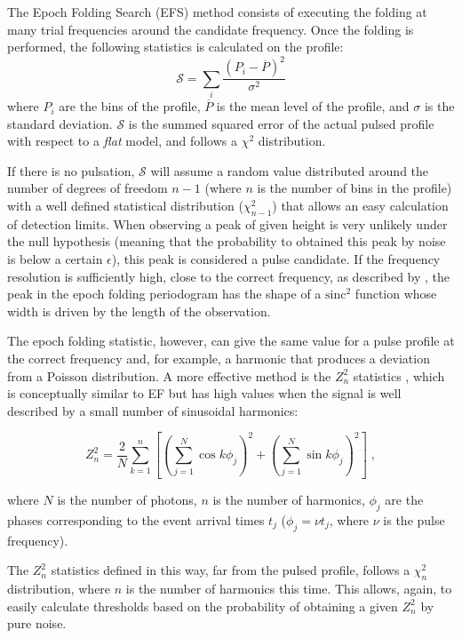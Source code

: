 \documentclass[twocolumn]{aastex62}
\newcommand{\zsq}{\ensuremath{Z^2_n}\xspace}
\begin{document}
The Epoch Folding Search (EFS) method consists of executing the folding at many trial frequencies around the candidate frequency.
Once the folding is performed, the following statistics is calculated on the profile:
\begin{equation}
\mathcal{S} = \sum_i\frac{(P_i - \overline{P})^2}{\sigma^2}
\end{equation}
where $P_i$ are the bins of the profile, $\overline{P}$ is the mean level of the profile, and $\sigma$ is the standard deviation.
$\mathcal{S}$ is the summed squared error of the actual pulsed profile with respect to a \textit{flat} model, and follows a $\chi^2$ distribution.

If there is no pulsation, $\mathcal{S}$ will assume a random value distributed around the number of degrees of freedom $n - 1$ (where $n$ is the number of bins in the profile) with a well defined statistical distribution ($\chi^2_{n - 1}$) that allows an easy calculation of detection limits. 
When observing a peak of given height is very unlikely under the null hypothesis (meaning that the probability to obtained this peak by noise is below a certain $\epsilon$), this peak is considered a pulse candidate.
If the frequency resolution is sufficiently high, close to the correct frequency, as described by \citep{leahy1983b,leahy1987}, the peak in the epoch folding periodogram has the shape of a $\mathrm{sinc}^2$ function whose width is driven by the length of the observation.

The epoch folding statistic, however, can give the same value for a pulse profile at the correct frequency and, for example, a harmonic that produces a deviation from a Poisson distribution.
A more effective method is the $Z^2_n$ statistics \citep{buccheri1983}, which is conceptually similar to EF but has high values when the signal is well described by a small number of sinusoidal harmonics: 

\begin{equation}
\zsq = \dfrac{2}{N} \sum_{k=1}^n \left[{\left(\sum_{j=1}^N \cos k \phi_j\right)}^2 + {\left(\sum_{j=1}^N \sin k \phi_j\right)}^2\right] \; ,
\end{equation}

\noindent where $N$ is the number of photons, $n$ is the number of harmonics, $\phi_j$ are the phases corresponding to the event arrival times $t_j$ ($\phi_j = \nu t_j$, where $\nu$ is the pulse frequency).

The \zsq statistics defined in this way, far from the pulsed profile, follows a $\chi^2_n$ distribution, where $n$ is the number of harmonics this time.
This allows, again, to easily calculate thresholds based on the probability of obtaining a given \zsq by pure noise.
\end{document}

